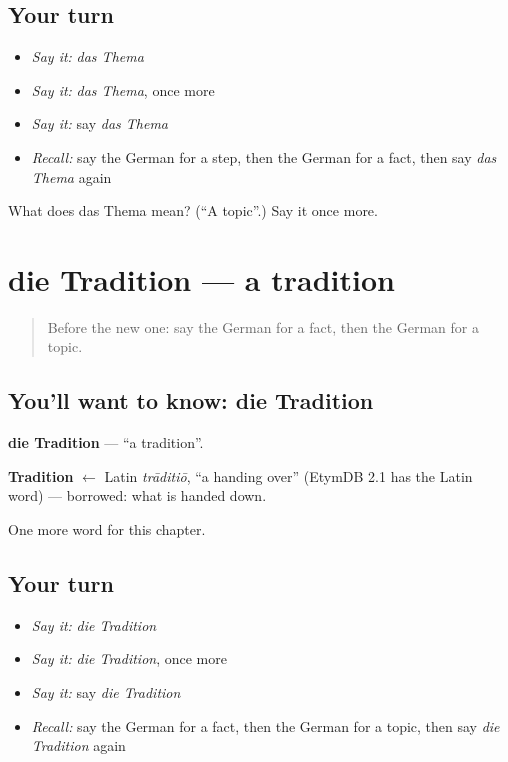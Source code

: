 \subsection*{Your turn}
\begin{itemize}
\raggedright
  \item \emph{Say it:} \emph{das Thema}
  \item \emph{Say it:} \emph{das Thema}, once more
  \item \emph{Say it:} say \emph{das Thema}
  \item \emph{Recall:} say the German for a step, then the German for a fact, then say \emph{das Thema} again
\end{itemize}

\begin{tcolorbox}[breakable,colback=teal!4,colframe=teal!35!black,title={Before you move on}]
What does das Thema mean? (\textquotedblleft{}A topic\textquotedblright{}.) Say it once more.
\end{tcolorbox}
\section[die Tradition]{die Tradition — a tradition}

\label{lesson:GE-C240-tradition}



\begin{quote}
Before the new one: say the German for a fact, then the German for a topic.
\end{quote}

\subsection*{You'll want to know: die Tradition}
\textbf{die Tradition} — \textquotedblleft{}a tradition\textquotedblright{}.

\begin{cousinweb}
\textbf{Tradition} $\leftarrow$ Latin \emph{trāditiō}, \textquotedblleft{}a handing over\textquotedblright{} (EtymDB 2.1 has the Latin word) — borrowed: what is handed down.
\end{cousinweb}

\begin{grammarlens}[title={What you've built}]
One more word for this chapter.
\end{grammarlens}

\subsection*{Your turn}
\begin{itemize}
\raggedright
  \item \emph{Say it:} \emph{die Tradition}
  \item \emph{Say it:} \emph{die Tradition}, once more
  \item \emph{Say it:} say \emph{die Tradition}
  \item \emph{Recall:} say the German for a fact, then the German for a topic, then say \emph{die Tradition} again
\end{itemize}

